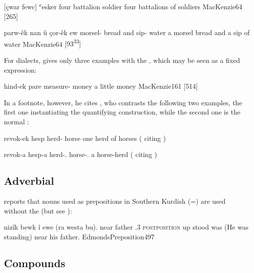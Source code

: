 {[çwar fewc] ʿesker}
{four battalion soldier}
{four battalions of soldiers}
{MacKenzie}{64 {[265]}}

{parw-êk nan û çor-êk ew}
{morsel-\indef{} bread and sip-\indef{} water}
{a morsel bread and a sip of water}
{MacKenzie}{64 {[93\textsuperscript{33}]}}

For \Kur dialects, \citet[161, \S 264.(e)]{MacKenzie} gives only three examples with the \prim {}, which may be seen as a fixed expression:

{hind-ek pare}
{measure-\indef{} money}
{a little money}
{MacKenzie}{161 {[514]}}

In a footnote, however, he cites \citet{KurdoevSlova}, who contrasts the following two examples, the first one instantiating the quantifying  construction, while the second one is the normal \ez* {}: 

{revok-ek hesp}
{herd-\indef{} horse}
{one herd of horses}
{}{(\cite[161, fn.\ 1]{MacKenzie} citing \cite[34]{KurdoevSlova})}

{revok-a hesp-a}
{herd-\ez.\fem{} horse-\obl.\pl{}}
{a horse-herd}
{}{(\cite[161, fn.\ 1]{MacKenzie} citing \cite[34]{KurdoevSlova})}

\subsection{Adverbial \prims}

\citet[497]{EdmondsPreposition} reports that nouns used as prepositions in Southern Kurdish (=\Sor) are used without the \ez* (but see ):

{nizîk bewk \cb{}î \cb{}ewe (ra westa \cb{}bu).} 
{near\footnotemark{} father \cb{}\poss.3\sg{} \cb{}\textsc{postposition} up stood \cb{}was}
{(He was standing) near his father.}
{EdmondsPreposition}{497}


\subsection{Compounds}

